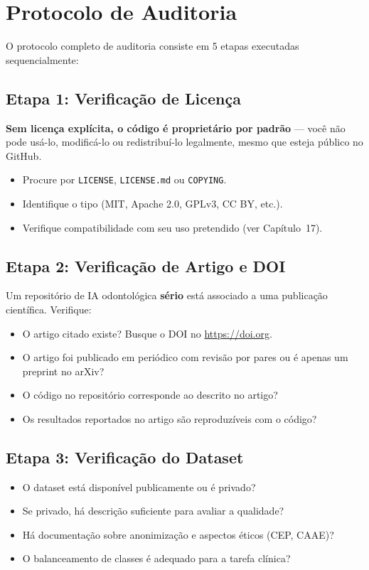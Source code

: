 \section{Protocolo de Auditoria}

O protocolo completo de auditoria consiste em 5 etapas executadas
sequencialmente:

\subsection{Etapa 1: Verificação de Licença}

\textbf{Sem licença explícita, o código é proprietário por padrão} —
você não pode usá-lo, modificá-lo ou redistribuí-lo legalmente, mesmo
que esteja público no GitHub.

\begin{itemize}
  \item Procure por \texttt{LICENSE}, \texttt{LICENSE.md} ou \texttt{COPYING}.
  \item Identifique o tipo (MIT, Apache 2.0, GPLv3, CC BY, etc.).
  \item Verifique compatibilidade com seu uso pretendido (ver Capítulo~17).
\end{itemize}

\subsection{Etapa 2: Verificação de Artigo e DOI}

Um repositório de IA odontológica \textbf{sério} está associado a uma
publicação científica. Verifique:

\begin{itemize}
  \item O artigo citado existe? Busque o DOI no \url{https://doi.org}.
  \item O artigo foi publicado em periódico com revisão por pares ou é
    apenas um preprint no arXiv?
  \item O código no repositório corresponde ao descrito no artigo?
  \item Os resultados reportados no artigo são reproduzíveis com o código?
\end{itemize}

\subsection{Etapa 3: Verificação do Dataset}

\begin{itemize}
  \item O dataset está disponível publicamente ou é privado?
  \item Se privado, há descrição suficiente para avaliar a qualidade?
  \item Há documentação sobre anonimização e aspectos éticos (CEP, CAAE)?
  \item O balanceamento de classes é adequado para a tarefa clínica?
\end{itemize}

